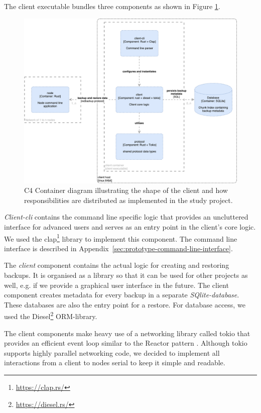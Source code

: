 The \gls{client} executable bundles three components as shown in Figure \ref{fig:c4-client-container}.

\begin{figure}[h]
	\centering
	\includegraphics[width=1\linewidth]{resources/c4-client-container}
	\caption[Client specific C4 Container diagram]{C4 Container diagram illustrating the shape of the \gls{client} and how responsibilities are distributed as implemented in the study project.}
	\label{fig:c4-client-container}
\end{figure}

\emph{Client-cli} contains the command line specific logic that provides an uncluttered interface for advanced users and serves as an entry point in the client's core logic. We used the clap\footnote{\url{https://clap.rs/}} library to implement this component. The command line interface is described in Appendix~\ref{sec:prototype-command-line-interface}.

The \emph{client} component contains the actual logic for creating and restoring backups. It is organised as a library so that it can be used for other projects as well, e.g. if we provide a graphical user interface in the future. The \gls{client} component creates metadata for every backup in a separate \emph{SQlite-database}. These databases are also the entry point for a restore. For database access, we used the Diesel\footnote{\url{https://diesel.rs/}} ORM-library.

The \gls{client} components make heavy use of a networking library called tokio\cite{tokio-rs} that provides an efficient event loop similar to the Reactor pattern \cite{POSA1}. Although tokio supports highly parallel networking code, we decided to implement all interactions from a \gls{client} to \glspl{node} serial to keep it simple and readable.


